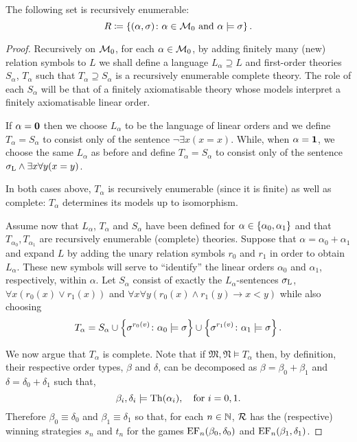 \begin{lem}\label{lem:psscat}
	The following set is recursively enumerable:
	\begin{equation}
		R\coloneqq\left\lbrace (\alpha,\sigma)\colon \alpha\in\mathcal{M}_0\text{ and }\alpha\models\sigma \right\rbrace.
	\end{equation}
\end{lem}
\begin{proof}
	Recursively on $\mathcal{M}_0$, for each $\alpha\in\mathcal{M}_0$, by adding finitely many (new) relation symbols to $L$ we shall define a language $L_\alpha\supseteq L$ and first-order theories $S_\alpha$, $T_\alpha$ such that $T_\alpha\supseteq S_\alpha$ is a recursively enumerable complete theory.  The role of each $S_\alpha$ will be that of a finitely axiomatisable theory whose models interpret a finitely axiomatisable linear order.

	If $\alpha=\mathbf{0}$ then we choose $L_\alpha$ to be the language of linear orders and we define $T_\alpha=S_\alpha$ to consist only of the sentence $\neg\exists x(x=x)$.  While, when $\alpha=\mathbf{1}$, we choose the same $L_\alpha$ as before and define $T_\alpha=S_\alpha$ to consist only of the sentence $\sigma_{\mathrm{L}}\wedge\exists x\forall y(x=y)$.

	In both cases above, $T_\alpha$ is recursively enumerable (since it is finite) as well as complete:  $T_\alpha$ determines its models up to isomorphism.

	Assume now that $L_\alpha$, $T_\alpha$ and $S_\alpha$ have been defined for $\alpha\in\left\lbrace \alpha_0,\alpha_1\right\rbrace$ and that $T_{\alpha_0},T_{\alpha_1}$ are recursively enumerable (complete) theories.  Suppose that $\alpha=\alpha_0+\alpha_1$ and expand $L$ by adding the unary relation symbols $r_0$ and $r_1$ in order to obtain $L_\alpha$.  These new symbols will serve to ``identify'' the linear orders $\alpha_0$ and $\alpha_1$, respectively, within $\alpha$.  Let $S_\alpha$ consist of exactly the $L_\alpha$-sentences $\sigma_{\mathrm{L}}$, $\forall x(r_0(x)\vee r_1(x))$ and $\forall x\forall y(r_0(x)\wedge r_1(y)\rightarrow x<y)$ while also choosing
	\begin{equation}
		T_\alpha=S_\alpha\cup\left\lbrace \sigma^{r_0(v)}\colon \alpha_0\models\sigma \right\rbrace\cup\left\lbrace \sigma^{r_1(v)}\colon \alpha_1\models\sigma \right\rbrace.
	\end{equation}

	We now argue that $T_\alpha$ is complete.  Note that if $\mathfrak{M},\mathfrak{N}\models T_\alpha$ then, by definition, their respective order types, $\beta$ and $\delta$, can be decomposed as $\beta=\beta_0+\beta_1$ and $\delta=\delta_0+\delta_1$ such that,
	\begin{equation}
		\beta_i,\delta_i\models\operatorname{Th}(\alpha_i), \quad\text{for }i=0,1.
	\end{equation}
	Therefore $\beta_0\equiv\delta_0$ and $\beta_1\equiv\delta_1$ so that, for each $n\in\mathbb{N}$, $\mathcal{R}$ has the (respective) winning strategies $s_n$ and $t_n$ for the games $\operatorname{EF}_n(\beta_0,\delta_0)$ and $\operatorname{EF}_n(\beta_1,\delta_1)$.


\end{proof}
